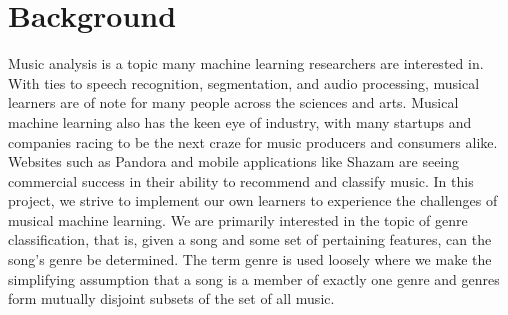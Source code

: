 \documentclass[11pt, twocolumn]{article}
\begin{document}
\section{Background}
    Music analysis is a topic many machine learning researchers are interested
in. With ties to speech recognition, segmentation, and audio processing,
musical learners are of note for many people across the sciences and arts.
Musical machine learning also has the keen eye of industry, with many startups
and companies racing to be the next craze for music producers and consumers
alike. Websites such as Pandora and mobile applications like Shazam are seeing
commercial success in their ability to recommend and classify music. In this
project, we strive to implement our own learners to experience the challenges
of musical machine learning. We are primarily interested in the topic of genre
classification, that is, given a song and some set of pertaining features, can
the song’s genre be determined. The term genre is used loosely where we make
the simplifying assumption that a song is a member of exactly one genre and
genres form mutually disjoint subsets of the set of all music.
\end{document}
